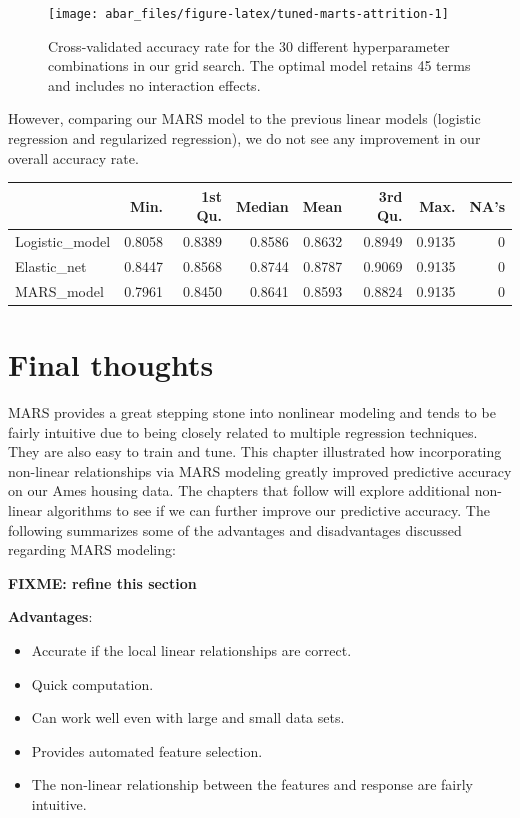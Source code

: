 \documentclass[]{book}
\providecommand{\tightlist}{%
  \setlength{\itemsep}{0pt}\setlength{\parskip}{0pt}}
\theoremstyle{definition}
\theoremstyle{definition}
\theoremstyle{definition}
\theoremstyle{remark}
\begin{document}
\begin{figure}

{\centering \texttt{[image: abar\_files/figure-latex/tuned-marts-attrition-1]} 

}

\caption{Cross-validated accuracy rate for the 30 different hyperparameter combinations in our grid search. The optimal model retains 45 terms and includes no interaction effects.}\label{fig:tuned-marts-attrition}
\end{figure}

However, comparing our MARS model to the previous linear models
(logistic regression and regularized regression), we do not see any
improvement in our overall accuracy rate.

\begin{table}[H]
\centering
\begin{tabular}{l|r|r|r|r|r|r|r}
\hline
  & Min. & 1st Qu. & Median & Mean & 3rd Qu. & Max. & NA's\\
\hline
Logistic\_model & 0.8058 & 0.8389 & 0.8586 & 0.8632 & 0.8949 & 0.9135 & 0\\
\hline
Elastic\_net & 0.8447 & 0.8568 & 0.8744 & 0.8787 & 0.9069 & 0.9135 & 0\\
\hline
MARS\_model & 0.7961 & 0.8450 & 0.8641 & 0.8593 & 0.8824 & 0.9135 & 0\\
\hline
\end{tabular}
\end{table}

\hypertarget{final-thoughts-3}{%
\section{Final thoughts}\label{final-thoughts-3}}

MARS provides a great stepping stone into nonlinear modeling and tends
to be fairly intuitive due to being closely related to multiple
regression techniques. They are also easy to train and tune. This
chapter illustrated how incorporating non-linear relationships via MARS
modeling greatly improved predictive accuracy on our Ames housing data.
The chapters that follow will explore additional non-linear algorithms
to see if we can further improve our predictive accuracy. The following
summarizes some of the advantages and disadvantages discussed regarding
MARS modeling:

\textbf{FIXME: refine this section}

\textbf{Advantages}:

\begin{itemize}
\tightlist
\item
  Accurate if the local linear relationships are correct.
\item
  Quick computation.
\item
  Can work well even with large and small data sets.
\item
  Provides automated feature selection.
\item
  The non-linear relationship between the features and response are
  fairly intuitive.
\end{itemize}
\end{document}
